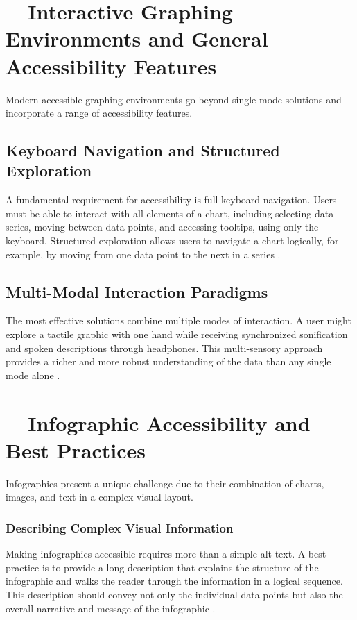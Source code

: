 \section{~~Interactive Graphing Environments and General Accessibility Features}\label{ch13:sec:interactive-environments}
Modern accessible graphing environments go beyond single-mode solutions and incorporate a range of accessibility features.

\subsection{Keyboard Navigation and Structured Exploration}\label{ch13:ssec:keyboard-navigation}
A fundamental requirement for accessibility is full keyboard navigation. Users must be able to interact with all elements of a chart, including selecting data series, moving between data points, and accessing tooltips, using only the keyboard. Structured exploration allows users to navigate a chart logically, for example, by moving from one data point to the next in a series \supercite{AutoVizuA11y}.

\subsection{Multi-Modal Interaction Paradigms}\label{ch13:ssec:multi-modal}
The most effective solutions combine multiple modes of interaction. A user might explore a tactile graphic with one hand while receiving synchronized sonification and spoken descriptions through headphones. This multi-sensory approach provides a richer and more robust understanding of the data than any single mode alone \supercite{RichScreenReaderExperiences, ReindersAccessibleData}.

\section{~~Infographic Accessibility and Best Practices}\label{ch13:sec:infographics}
Infographics present a unique challenge due to their combination of charts, images, and text in a complex visual layout.

\subsubsection{Describing Complex Visual Information}\label{ch13:sssec:describing-infographics}
Making infographics accessible requires more than a simple alt text. A best practice is to provide a long description that explains the structure of the infographic and walks the reader through the information in a logical sequence. This description should convey not only the individual data points but also the overall narrative and message of the infographic \supercite{CreatingAccessibleInfographics, AdaptingInfographics}.

